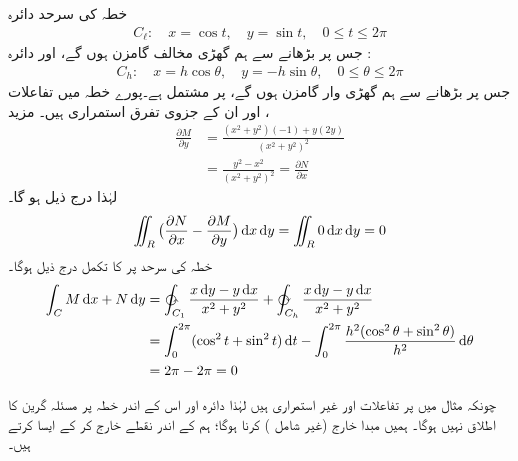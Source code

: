  خطہ   کی سرحد دائرہ 
\begin{align*}
 C_{\ell}:\quad  x=\cos t,\quad  y= \sin t,\quad 0\leq t \leq 2\pi 
\end{align*}
   جس پر    بڑھانے سے ہم  گھڑی مخالف گامزن ہوں گے، اور دائرہ :
\begin{align*}
  C_h:\quad  x=h\cos \theta,\quad  y= -h\sin\theta,\quad 0\leq \theta \leq 2\pi  
\end{align*}
جس پر    بڑھانے سے ہم  گھڑی وار  گامزن ہوں گے، پر مشتمل ہے۔پورے  خطہ  میں تفاعلات   ،   اور ان کے جزوی تفرق استمراری ہیں۔ مزید  
\begin{align*}
     \frac{\partial M}{\partial y} &= \frac{(x^2 + y^2)(-1) + y(2y)}{(x^2 + y^2)^2} \\     &= \frac{y^2 - x^2}{(x^2 + y^2)^2} = \frac{\partial N}{\partial x} 
\end{align*}
  لہٰذا  درج ذیل ہو گا۔
\begin{align*}
     \iint_R \big(\frac{\partial N}{\partial x} - \frac{\partial M}{\partial y}\big) \dif x \dif y = \iint_R 0 \dif x \dif y =0  
\end{align*}
 خطہ  کی سرحد پر   کا  تکمل  درج ذیل ہوگا۔ 
\begin{align*}
 \int_C M \dif x + N \dif y &= \ointctrclockwise_{C_1} \frac{x \dif y - y \dif x}{x^2 + y^2} + \varointclockwise_{C_h}  \frac{x \dif y - y \dif x}{x^2 + y^2} \\ 
 &= \int_0^{2\pi} (\cos^2{t} + \sin^2{t}) \dif t - \int_0^{2\pi} \frac{h^2 (\cos^2{\theta} + \sin^2{\theta})}{h^2} \dif \theta\\
  &= 2\pi - 2\pi =0  
\end{align*}

چونکہ مثال      میں  پر تفاعلات  اور   غیر استمراری ہیں لہٰذا دائرہ   اور اس کے اندر خطہ پر مسئلہ گرین کا اطلاق نہیں ہوگا۔ ہمیں  مبدا   خارج (غیر شامل ) کرنا ہوگا؛ ہم   کے اندر نقطے  خارج کر کے ایسا کرتے ہیں۔


